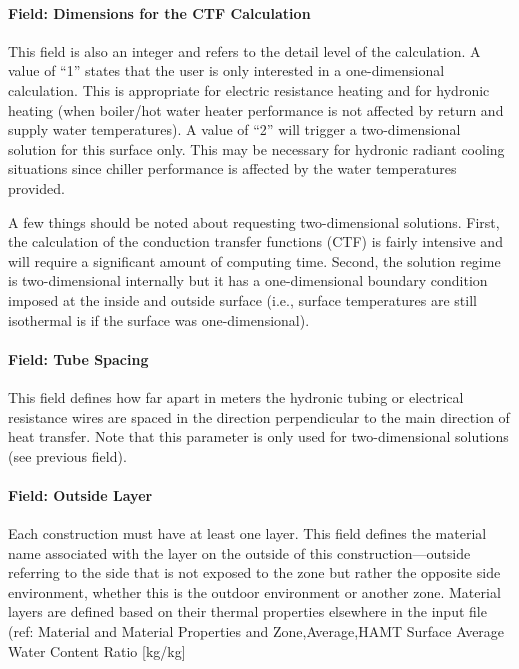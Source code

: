 \paragraph{Field: Dimensions for the CTF Calculation}\label{field-dimensions-for-the-ctf-calculation}

This field is also an integer and refers to the detail level of the calculation. A value of ``1'' states that the user is only interested in a one-dimensional calculation. This is appropriate for electric resistance heating and for hydronic heating (when boiler/hot water heater performance is not affected by return and supply water temperatures). A value of ``2'' will trigger a two-dimensional solution for this surface only. This may be necessary for hydronic radiant cooling situations since chiller performance is affected by the water temperatures provided.

A few things should be noted about requesting two-dimensional solutions. First, the calculation of the conduction transfer functions (CTF) is fairly intensive and will require a significant amount of computing time. Second, the solution regime is two-dimensional internally but it has a one-dimensional boundary condition imposed at the inside and outside surface (i.e., surface temperatures are still isothermal is if the surface was one-dimensional).

\paragraph{Field: Tube Spacing}\label{field-tube-spacing}

This field defines how far apart in meters the hydronic tubing or electrical resistance wires are spaced in the direction perpendicular to the main direction of heat transfer. Note that this parameter is only used for two-dimensional solutions (see previous field).

\paragraph{Field: Outside Layer}\label{field-outside-layer-1}

Each construction must have at least one layer. This field defines the material name associated with the layer on the outside of this construction---outside referring to the side that is not exposed to the zone but rather the opposite side environment, whether this is the outdoor environment or another zone. Material layers are defined based on their thermal properties elsewhere in the input file (ref: Material and Material Properties and Zone,Average,HAMT Surface Average Water Content Ratio {[}kg/kg{]}

